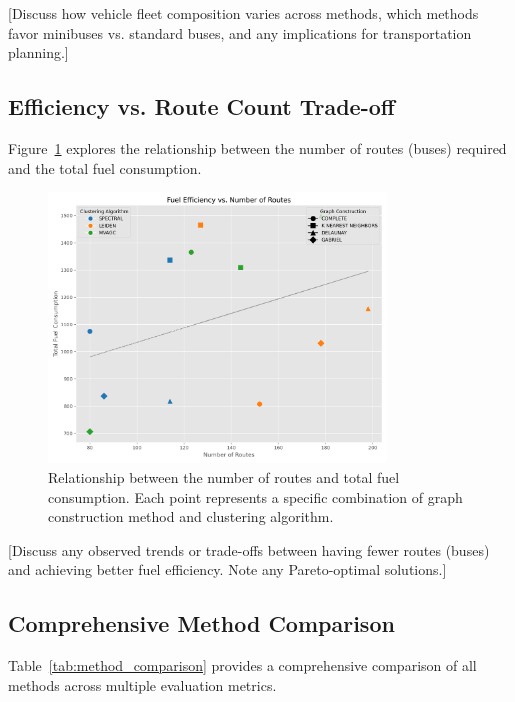 [Discuss how vehicle fleet composition varies across methods, which methods favor minibuses vs. standard buses, and any implications for transportation planning.]

\subsection{Efficiency vs. Route Count Trade-off}
\label{subsec:efficiency_routes}

Figure~\ref{fig:efficiency_vs_routes} explores the relationship between the number of routes (buses) required and the total fuel consumption.

\begin{figure}[!htbp]
\centering
\includegraphics[width=0.8\textwidth]{img/efficiency_vs_routes}
\caption{Relationship between the number of routes and total fuel consumption. Each point represents a specific combination of graph construction method and clustering algorithm.}
\label{fig:efficiency_vs_routes}
\end{figure}

[Discuss any observed trends or trade-offs between having fewer routes (buses) and achieving better fuel efficiency. Note any Pareto-optimal solutions.]

\subsection{Comprehensive Method Comparison}
\label{subsec:method_comparison}

Table~\ref{tab:method_comparison} provides a comprehensive comparison of all methods across multiple evaluation metrics.

